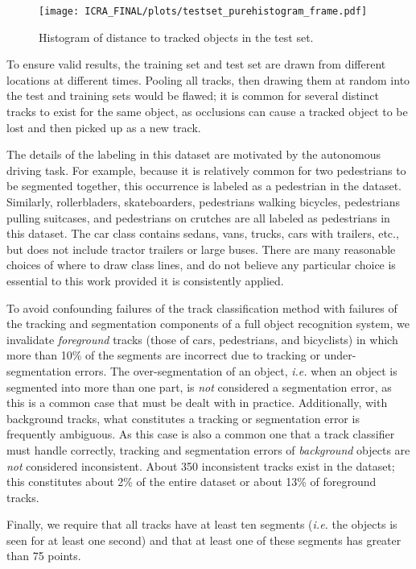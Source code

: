 \documentclass[letterpaper, 10 pt, conference]{ieeeconf}  %
\begin{document}
\begin{figure}
  \centering
  \texttt{[image: ICRA\_FINAL/plots/testset\_purehistogram\_frame.pdf]}
  \caption{Histogram of distance to tracked objects in the test set.}
  \label{fig:stc}
\end{figure}


To ensure valid results, the training set and test set are drawn from different locations at different times.  Pooling all tracks, then drawing them at random into the test and training sets would be flawed; it is common for several distinct tracks to exist for the same object, as occlusions can cause a tracked object to be lost and then picked up as a new track.

The details of the labeling in this dataset are motivated by the autonomous driving task.  For example, because it is relatively common for two pedestrians to be segmented together, this occurrence is labeled as a pedestrian in the dataset.  Similarly, rollerbladers, skateboarders, pedestrians walking bicycles, pedestrians pulling suitcases, and pedestrians on crutches are all labeled as pedestrians in this dataset.  The car class contains sedans, vans, trucks, cars with trailers, etc., but does not include tractor trailers or large buses.  There are many reasonable choices of where to draw class lines, and do not believe any particular choice is essential to this work provided it is consistently applied.

To avoid confounding failures of the track classification method with failures of the tracking and segmentation components of a full object recognition system, we invalidate \textit{foreground} tracks (those of cars, pedestrians, and bicyclists) in which more than 10\% of the segments are incorrect due to tracking or under-segmentation errors.  The over-segmentation of an object, \textit{i.e.} when an object is segmented into more than one part, is \textit{not} considered a segmentation error, as this is a common case that must be dealt with in practice.  Additionally, with background tracks, what constitutes a tracking or segmentation error is frequently ambiguous.  As this case is also a common one that a track classifier must handle correctly, tracking and segmentation errors of \textit{background} objects are \textit{not} considered inconsistent.  About 350 inconsistent tracks exist in the dataset; this constitutes about 2\% of the entire dataset or about 13\% of foreground tracks.

Finally, we require that all tracks have at least ten segments (\textit{i.e.} the objects is seen for at least one second) and that at least one of these segments has greater than 75 points.
\end{document}
